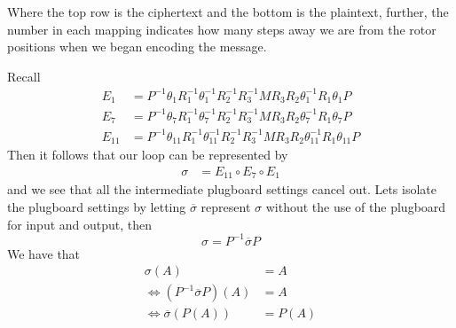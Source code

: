 Where the top row is the ciphertext and the bottom is the plaintext, further, the number in each mapping indicates how many steps away we are from the rotor 
positions when we began encoding the message.

\begin{center}
\end{center}

Recall
\begin{align*}
    E_1 &= P^{-1}\theta_1R_1^{-1}\theta_1^{-1}R_2^{-1}R_3^{-1}MR_3R_2\theta_1^{-1}R_1\theta_1P
    \\E_7 &= P^{-1}\theta_7R_1^{-1}\theta_7^{-1}R_2^{-1}R_3^{-1}MR_3R_2\theta_7^{-1}R_1\theta_7P
    \\E_{11} &= P^{-1}\theta_{11}R_1^{-1}\theta_{11}^{-1}R_2^{-1}R_3^{-1}MR_3R_2\theta_{11}^{-1}R_1\theta_{11}P
\end{align*}
Then it follows that our loop can be represented by 
\begin{align*}
    \sigma &= E_{11}\circ E_7 \circ E_{1}
\end{align*}
and we see that all the intermediate plugboard settings cancel out. Lets isolate the plugboard settings by letting 
$\overline{\sigma}$ represent $\sigma$ without the use of the plugboard for input and output, then 
\[
    \sigma = P^{-1}\overline{\sigma}P
\]
We have that
\begin{align*}
    \sigma(A) &= A
    \\\iff (P^{-1}\overline{\sigma}P)(A) &= A
    \\\iff \overline{\sigma}(P(A)) &= P(A)
\end{align*}

